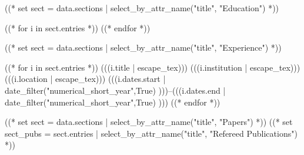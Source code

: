 \documentclass[10pt, letterpaper]{awesome-cv}
\begin{document}
\makecvheader

\makecvfooter
  {}
  {}
  {}



((* set sect = data.sections | select_by_attr_name("title", "Education") *))
\begin{cvhonors}
((* for i in sect.entries *))
((* endfor *))
\end{cvhonors}

((* set sect = data.sections | select_by_attr_name("title", "Experience") *))
\begin{cvhonors}
((* for i in sect.entries *))
\cvhonor
  {(((i.title | escape_tex)))}
  {(((i.institution | escape_tex)))}
  {(((i.location | escape_tex)))}
  {(((i.dates.start | date_filter("numerical_short_year",True) )))--(((i.dates.end | date_filter("numerical_short_year",True) )))}
((* endfor *))
\end{cvhonors}

((* set  sect = data.sections | select_by_attr_name("title", "Papers") *))
((* set sect_pubs = sect.entries | select_by_attr_name("title", "Refereed Publications") *))
\end{document}
